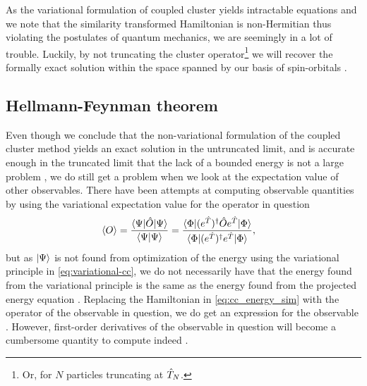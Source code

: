             As the variational formulation of coupled cluster yields intractable
            equations and we note that the similarity transformed Hamiltonian is
            non-Hermitian thus violating the postulates of quantum mechanics, we
            are seemingly in a lot of trouble.
            Luckily, by not truncating the cluster operator\footnote{%
                Or, for $N$ particles truncating at $\hat{T}_N$.
            } we will recover the formally exact solution within the space
            spanned by our basis of spin-orbitals \cite{coester1958421,
            monkhorst1977421}.

        \subsection{Hellmann-Feynman theorem}
            Even though we conclude that the non-variational formulation of
            the coupled cluster method yields an exact solution in the
            untruncated limit, and is accurate enough in the truncated limit
            that the lack of a bounded energy is not a large problem
            \cite{helgaker-molecular}, we do still get a problem when we look at
            the expectation value of other observables.
            There have been attempts at computing observable quantities by using
            the variational expectation value for the operator in question
            \cite{exp-value-cizek, fink1974163}
            \begin{align}
                \left\langle O \right\rangle
                &= \frac{\langle \Psi |\hat{O}| \Psi \rangle}{\langle \Psi | \Psi \rangle}
                = \frac{
                    \langle \Phi | (e^{\hat{T}})^{\dagger}
                    \hat{O}
                    e^{\hat{T}}| \Phi \rangle}
                {\langle \Phi | (e^{\hat{T}})^{\dagger} e^{\hat{T}} | \Phi \rangle},
            \end{align}
            but as $| \Psi \rangle$ is not found from optimization of the energy
            using the variational principle in \autoref{eq:variational-cc}, we
            do not necessarily have that the energy found from the variational
            principle is the same as the energy found from the projected energy
            equation \cite{kvaal2013variational}.
            Replacing the Hamiltonian in \autoref{eq:cc_energy_sim} with the
            operator of the observable in question, we do get an expression for
            the observable \cite{kvaal2013variational}.
            However, first-order derivatives of the observable in question will
            become a cumbersome quantity to compute indeed
            \cite{helgaker-molecular}.

